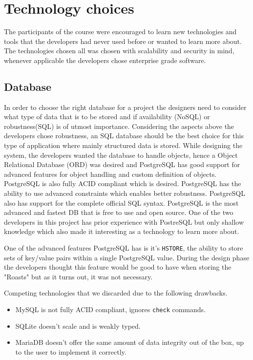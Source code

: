 \documentclass[12pt,a4paper]{report}
\begin{document}
\chapter{Technology choices}
The participants of the course were encouraged to learn new technologies and tools that the developers had never used before or wanted to learn more about. The technologies chosen all was chosen with scalability and security in mind, whenever applicable the developers chose enterprise grade software.
\section{Database}
In order to choose the right database for a project the designers need to consider what type of data that is to be stored and if availability (NoSQL) or robustness(SQL) is of utmost importance.
Considering the aspects above the developers chose robustness, an SQL database should be the best choice for this type of application where mainly structured data is stored. 
While designing the system, the developers wanted the database to handle objects, hence a Object Relational Database (ORD) was desired and PostgreSQL has good support for advanced features for object handling and custom definition of objects. PostgreSQL is also fully ACID compliant which is desired. PostgreSQL has the ability to use advanced constraints which enables better robustness. PostgreSQL also has support for the complete official SQL syntax. PostgreSQL is the most advanced and fastest DB\cite{db-benchmark} that is free to use and open source.
One of the two developers in this project has prior experience with PostreSQL but only shallow knowledge which also made it interesting as a technology to learn more about.

One of the advanced features PostgreSQL has is it's \texttt{HSTORE}, the ability to store sets of key/value pairs within a single PostgreSQL value. During the design phase the developers thought this feature would be good to have when storing the "Roasts" but as it turns out, it was not necessary.

Competing technologies that we discarded due to the following drawbacks.
\begin{itemize}
    \item MySQL is not fully ACID compliant, ignores \texttt{check} commands.
    \item SQLite doesn't scale and is weakly typed.
    \item MariaDB doesn't offer the same amount of data integrity out of the box, up to the user to implement it correctly. 
\end{itemize}
\end{document}
